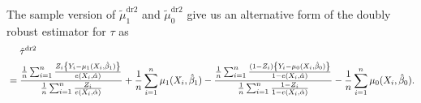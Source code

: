 \documentclass[10pt]{article}
\begin{document}
The sample version of
$\tilde{\mu}_1^{\text{dr2}}$ and 
$\tilde{\mu}_0^{\text{dr2}}$ give us
an alternative form of the doubly robust estimator for $\tau$ as
\begin{align*}
  &\mathrel{\phantom{=}}\hat{\tau}^{\text{dr2}} \\
  &= \frac{\frac{1}{n} \sum_{i=1}^n \frac{Z_i{\left\lbrace Y_i - \mu_1(X_i, \hat{\beta}_1) \right\rbrace}}{e(X_i, \hat{\alpha})}}{\frac{1}{n} \sum_{i=1}^n \frac{Z_i}{e(X_i, \hat{\alpha})}} + \frac{1}{n} \sum_{i=1}^n \mu_1(X_i, \hat{\beta}_1)
  - \frac{\frac{1}{n} \sum_{i=1}^n \frac{(1 - Z_i){\left\lbrace Y_i - \mu_0(X_i, \hat{\beta}_0) \right\rbrace}}{1 - e(X_i, \hat{\alpha})}}{\frac{1}{n} \sum_{i=1}^n \frac{1 - Z_i}{1 - e(X_i, \hat{\alpha})}} - \frac{1}{n} \sum_{i=1}^n \mu_0(X_i, \hat{\beta}_0).
\end{align*}


\printglossaries
\end{document}
